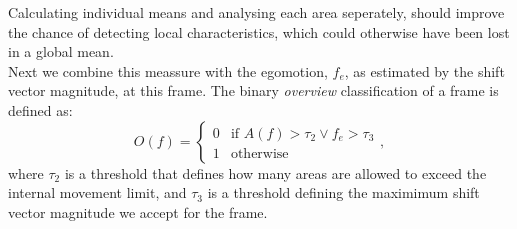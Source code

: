%
Calculating individual means and analysing each area seperately, should improve the chance of detecting local characteristics, which could otherwise have been lost in a global mean.\\
 Next we combine this meassure with the egomotion, $f_{e}$, as estimated by the shift vector magnitude, at this frame. The binary \textit{overview} classification of a frame is defined as:
\begin{equation}
O(f) =
\begin{cases}
0 & \text{if } A(f) > \tau_{2} \vee f_{e} > \tau_{3} \\
1 &  \text{otherwise}
\end{cases},
\end{equation}
where $\tau_{2}$ is a threshold that defines how many areas are allowed to exceed the internal movement limit, and $\tau_{3}$ is a threshold defining the maximimum shift vector magnitude we accept for the frame.
%
